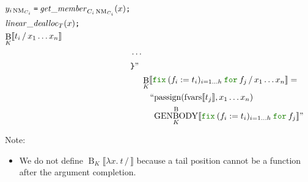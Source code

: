 \documentclass[a4paper,fleqn]{article}
\newcommand{\kwfix}{\mbox{\color{mygreen}\ttfamily fix}}
\newcommand{\kwfor}{\mbox{\color{mygreen}\ttfamily for}}
\newcommand{\lam}[2]{\lambda #1.\:#2}
\newcommand{\fix}[4]{\kwfix\:(#1 := #2)_{#3}\:\kwfor\:#4}
\DeclareMathOperator{\NM}{NM} %
\newcommand{\BRA}[1]{\llbracket #1 \rrbracket}
\DeclareMathOperator{\genbody}{GENBODY}
\newcommand{\genbodyb}[2]{\genbody^\mathrm{B}_{#1}\BRA{#2}}
\newcommand{\ldq}{\text{``}}
\newcommand{\rdq}{\text{''}}
\newcommand{\ttrbrace}{\texttt{\char '175}}
\newcommand{\tteq}{\texttt{=}}
\newcommand{\ttsemi}{\texttt{;}}
\DeclareMathOperator{\passign}{passign}
\DeclareMathOperator{\fvarsop}{fvars}
\newcommand{\fvars}[1]{\fvarsop\BRA{#1}}
\DeclareMathOperator{\Bop}{B}
\newcommand{\B}[3]{\Bop_{#1}\BRA{#2\,/\,#3}}
\begin{document}
\begin{align*}
\begin{alignedat}{2}
\begin{aligned}[t]
                & y_{i\NM_{C_i}}\:\tteq\:\mathit{get\_member}_{C_i\NM_{C_i}}(x)\ttsemi \\
                & \mathit{linear\_dealloc}_{T}(x)\ttsemi \\
                & {\B{K}{t_i}{x_1\ldots x_n}}
              \end{aligned} \\
            & \cdots \\
            & \ttrbrace\rdq
     \end{alignedat} \\
  &\B{K}{\fix{f_i}{t_i}{i=1\ldots h}{f_j}}{x_1\ldots x_n} =       \\
     & \quad\begin{alignedat}{2}
       \ldq & {\passign(\fvars{t_j}, x_1\ldots x_n)} \\
            & {\genbodyb{K}{\fix{f_i}{t_i}{i=1\ldots h}{f_j}}} \rdq
       \end{alignedat}
\end{align*}
{\small Note:
\begin{itemize}
  \item We do not define $\B{K}{\lam{x}{t}}{}$ because a tail position cannot be a function after the argument completion.
\end{itemize}}
\end{document}
